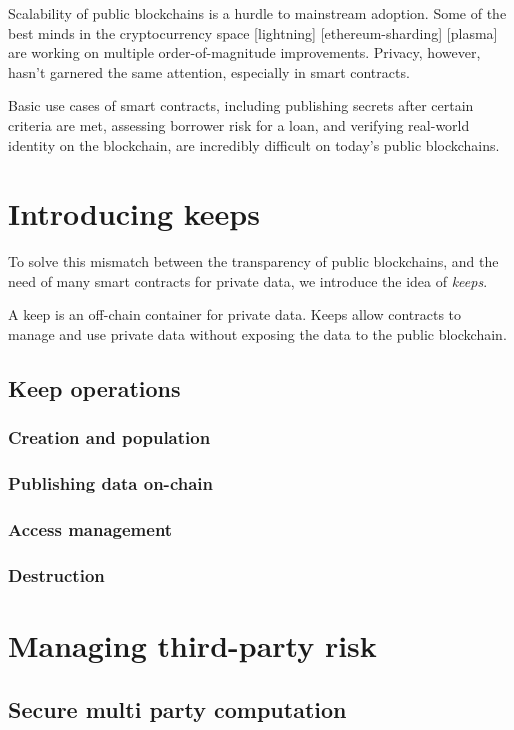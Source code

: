 \documentclass[11pt]{article}
\begin{document}
Scalability of public blockchains is a hurdle to mainstream adoption.
Some of the best minds in the cryptocurrency space [lightning]
[ethereum-sharding] [plasma] are working on multiple order-of-magnitude
improvements. Privacy, however, hasn’t garnered the same attention,
especially in smart contracts.

Basic use cases of smart contracts, including publishing secrets after
certain criteria are met, assessing borrower risk for a loan, and
verifying real-world identity on the blockchain, are incredibly
difficult on today’s public blockchains.

\section{Introducing keeps}

To solve this mismatch between the transparency of public blockchains,
and the need of many smart contracts for private data, we introduce
the idea of {\em keeps}.

A keep is an off-chain container for private data. Keeps allow
contracts to manage and use private data without exposing the data to
the public blockchain.

\subsection{Keep operations}

\subsubsection{Creation and population}
\subsubsection{Publishing data on-chain}
\subsubsection{Access management}
\subsubsection{Destruction}

\section{Managing third-party risk}

\subsection{Secure multi party computation}
\end{document}
